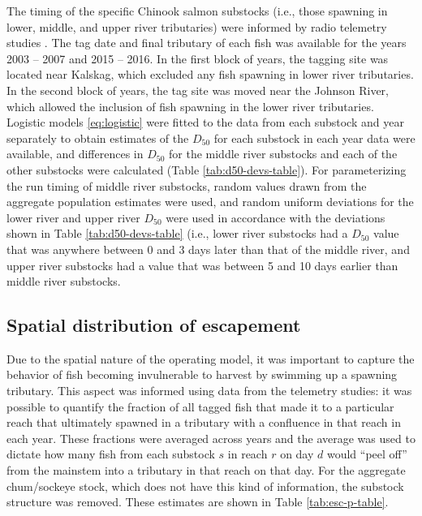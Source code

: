 \documentclass[12pt,]{book}
\theoremstyle{definition}
\theoremstyle{definition}
\theoremstyle{definition}
\theoremstyle{remark}
\begin{document}
\noindent
The timing of the specific Chinook salmon substocks (i.e., those
spawning in lower, middle, and upper river tributaries) were informed by
radio telemetry studies
\citep{stuby-2007, smith-liller-2017a, smith-liller-2017b}. The tag date
and final tributary of each fish was available for the years 2003 --
2007 and 2015 -- 2016. In the first block of years, the tagging site was
located near Kalskag, which excluded any fish spawning in lower river
tributaries. In the second block of years, the tag site was moved near
the Johnson River, which allowed the inclusion of fish spawning in the
lower river tributaries. Logistic models \eqref{eq:logistic} were fitted
to the data from each substock and year separately to obtain estimates
of the \(D_{50}\) for each substock in each year data were available,
and differences in \(D_{50}\) for the middle river substocks and each of
the other substocks were calculated (Table \ref{tab:d50-devs-table}).
For parameterizing the run timing of middle river substocks, random
values drawn from the aggregate population estimates were used, and
random uniform deviations for the lower river and upper river \(D_{50}\)
were used in accordance with the deviations shown in Table
\ref{tab:d50-devs-table} (i.e., lower river substocks had a \(D_{50}\)
value that was anywhere between 0 and 3 days later than that of the
middle river, and upper river substocks had a value that was between 5
and 10 days earlier than middle river substocks.

\subsection{Spatial distribution of escapement}\label{calc-esc-p}

\noindent
Due to the spatial nature of the operating model, it was important to
capture the behavior of fish becoming invulnerable to harvest by
swimming up a spawning tributary. This aspect was informed using data
from the telemetry studies: it was possible to quantify the fraction of
all tagged fish that made it to a particular reach that ultimately
spawned in a tributary with a confluence in that reach in each year.
These fractions were averaged across years and the average was used to
dictate how many fish from each substock \(s\) in reach \(r\) on day
\(d\) would ``peel off'' from the mainstem into a tributary in that
reach on that day. For the aggregate chum/sockeye stock, which does not
have this kind of information, the substock structure was removed. These
estimates are shown in Table \ref{tab:esc-p-table}.
\end{document}
